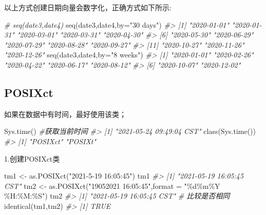 \documentclass[
]{book}
\newenvironment{Shaded}{\begin{snugshade}}{\end{snugshade}}
\newcommand{\AttributeTok}[1]{\textcolor[rgb]{0.77,0.63,0.00}{#1}}
\newcommand{\CommentTok}[1]{\textcolor[rgb]{0.56,0.35,0.01}{\textit{#1}}}
\newcommand{\FunctionTok}[1]{\textcolor[rgb]{0.00,0.00,0.00}{#1}}
\newcommand{\NormalTok}[1]{#1}
\newcommand{\OtherTok}[1]{\textcolor[rgb]{0.56,0.35,0.01}{#1}}
\newcommand{\StringTok}[1]{\textcolor[rgb]{0.31,0.60,0.02}{#1}}
\begin{document}
以上方式创建日期向量会数字化，正确方式如下所示:

\begin{Shaded}
\begin{Highlighting}[]
\CommentTok{\# seq(date3,date4)}
\FunctionTok{seq}\NormalTok{(date3,date4,}\AttributeTok{by=}\StringTok{"30 days"}\NormalTok{)}
\CommentTok{\#\textgreater{}  [1] "2020{-}01{-}01" "2020{-}01{-}31" "2020{-}03{-}01" "2020{-}03{-}31" "2020{-}04{-}30"}
\CommentTok{\#\textgreater{}  [6] "2020{-}05{-}30" "2020{-}06{-}29" "2020{-}07{-}29" "2020{-}08{-}28" "2020{-}09{-}27"}
\CommentTok{\#\textgreater{} [11] "2020{-}10{-}27" "2020{-}11{-}26" "2020{-}12{-}26"}
\FunctionTok{seq}\NormalTok{(date3,date4,}\AttributeTok{by=}\StringTok{"8 weeks"}\NormalTok{)}
\CommentTok{\#\textgreater{} [1] "2020{-}01{-}01" "2020{-}02{-}26" "2020{-}04{-}22" "2020{-}06{-}17" "2020{-}08{-}12"}
\CommentTok{\#\textgreater{} [6] "2020{-}10{-}07" "2020{-}12{-}02"}
\end{Highlighting}
\end{Shaded}

\hypertarget{the-POSIXct-class}{%
\subsection{POSIXct}\label{the-POSIXct-class}}

如果在数据中有时间，最好使用该类；

\begin{Shaded}
\begin{Highlighting}[]
\FunctionTok{Sys.time}\NormalTok{() }\CommentTok{\#获取当前时间}
\CommentTok{\#\textgreater{} [1] "2021{-}05{-}24 09:49:04 CST"}
\FunctionTok{class}\NormalTok{(}\FunctionTok{Sys.time}\NormalTok{())}
\CommentTok{\#\textgreater{} [1] "POSIXct" "POSIXt"}
\end{Highlighting}
\end{Shaded}

1.创建POSIXct类

\begin{Shaded}
\begin{Highlighting}[]
\NormalTok{tm1 }\OtherTok{\textless{}{-}} \FunctionTok{as.POSIXct}\NormalTok{(}\StringTok{"2021{-}5{-}19 16:05:45"}\NormalTok{)}
\NormalTok{tm1}
\CommentTok{\#\textgreater{} [1] "2021{-}05{-}19 16:05:45 CST"}
\NormalTok{tm2 }\OtherTok{\textless{}{-}} \FunctionTok{as.POSIXct}\NormalTok{(}\StringTok{"19052021 16:05:45"}\NormalTok{,}\AttributeTok{format =} \StringTok{"\%d\%m\%Y \%H:\%M:\%S"}\NormalTok{)}
\NormalTok{tm2}
\CommentTok{\#\textgreater{} [1] "2021{-}05{-}19 16:05:45 CST"}
\CommentTok{\# 比较是否相同}
\FunctionTok{identical}\NormalTok{(tm1,tm2)}
\CommentTok{\#\textgreater{} [1] TRUE}
\end{Highlighting}
\end{Shaded}
\end{document}
